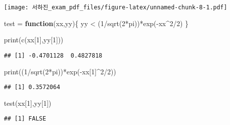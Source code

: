 \documentclass[
]{article}
\newenvironment{Shaded}{\begin{snugshade}}{\end{snugshade}}
\newcommand{\ControlFlowTok}[1]{\textcolor[rgb]{0.13,0.29,0.53}{\textbf{#1}}}
\newcommand{\DecValTok}[1]{\textcolor[rgb]{0.00,0.00,0.81}{#1}}
\newcommand{\FunctionTok}[1]{\textcolor[rgb]{0.00,0.00,0.00}{#1}}
\newcommand{\NormalTok}[1]{#1}
\newcommand{\OtherTok}[1]{\textcolor[rgb]{0.56,0.35,0.01}{#1}}
\newcommand{\SpecialCharTok}[1]{\textcolor[rgb]{0.00,0.00,0.00}{#1}}
\begin{document}
\texttt{[image: 서하진\_exam\_pdf\_files/figure-latex/unnamed-chunk-8-1.pdf]}

\begin{Shaded}
\begin{Highlighting}[]
\NormalTok{test }\OtherTok{=} \ControlFlowTok{function}\NormalTok{(xx,yy)\{}
\NormalTok{    yy }\SpecialCharTok{\textless{}}\NormalTok{ (}\DecValTok{1}\SpecialCharTok{/}\FunctionTok{sqrt}\NormalTok{(}\DecValTok{2}\SpecialCharTok{*}\NormalTok{pi))}\SpecialCharTok{*}\FunctionTok{exp}\NormalTok{(}\SpecialCharTok{{-}}\NormalTok{xx}\SpecialCharTok{\^{}}\DecValTok{2}\SpecialCharTok{/}\DecValTok{2}\NormalTok{)}
\NormalTok{\}}

\FunctionTok{print}\NormalTok{(}\FunctionTok{c}\NormalTok{(xx[}\DecValTok{1}\NormalTok{],yy[}\DecValTok{1}\NormalTok{])) }
\end{Highlighting}
\end{Shaded}

\begin{verbatim}
## [1] -0.4701128  0.4827818
\end{verbatim}

\begin{Shaded}
\begin{Highlighting}[]
\FunctionTok{print}\NormalTok{((}\DecValTok{1}\SpecialCharTok{/}\FunctionTok{sqrt}\NormalTok{(}\DecValTok{2}\SpecialCharTok{*}\NormalTok{pi))}\SpecialCharTok{*}\FunctionTok{exp}\NormalTok{(}\SpecialCharTok{{-}}\NormalTok{xx[}\DecValTok{1}\NormalTok{]}\SpecialCharTok{\^{}}\DecValTok{2}\SpecialCharTok{/}\DecValTok{2}\NormalTok{))}
\end{Highlighting}
\end{Shaded}

\begin{verbatim}
## [1] 0.3572064
\end{verbatim}

\begin{Shaded}
\begin{Highlighting}[]
\FunctionTok{test}\NormalTok{(xx[}\DecValTok{1}\NormalTok{],yy[}\DecValTok{1}\NormalTok{])}
\end{Highlighting}
\end{Shaded}

\begin{verbatim}
## [1] FALSE
\end{verbatim}
\end{document}
